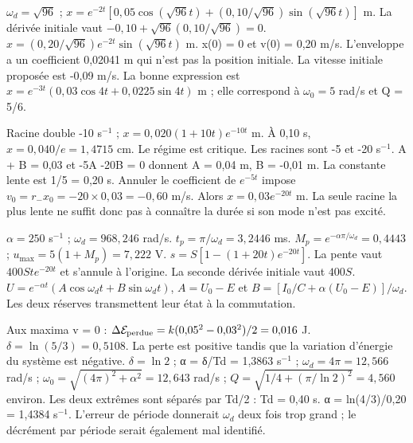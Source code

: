 $\omega_d=\sqrt{96}$ ; $x=e^{-2t}[0{,}05\cos(\sqrt{96}t)+(0{,}10/\sqrt{96})\sin(\sqrt{96}t)]$ m. La dérivée initiale vaut $-0{,}10+\sqrt{96}(0{,}10/\sqrt{96})=0$.
$x=(0{,}20/\sqrt{96})e^{-2t}\sin(\sqrt{96}t)$ m. x(0) = 0 et v(0) = 0,20 m/s. L’enveloppe a un coefficient 0,02041 m qui n’est pas la position initiale.
La vitesse initiale proposée est -0,09 m/s. La bonne expression est $x=e^{-3t}(0{,}03\cos4t+0{,}0225\sin4t)$ m ; elle correspond à $\omega_0=5$ rad/s et Q = 5/6.


Racine double -10 s$^{-1}$ ; $x=0{,}020(1+10t)e^{-10t}$ m. À 0,10 s, $x=0{,}040/e=1{,}4715$ cm. Le régime est critique.
Les racines sont -5 et -20 s$^{-1}$. A + B = 0,03 et -5A -20B = 0 donnent A = 0,04 m, B = -0,01 m. La constante lente est 1/5 = 0,20 s.
Annuler le coefficient de $e^{-5t}$ impose $v_0=r_-x_0=-20\times0{,}03=-0{,}60$ m/s. Alors $x=0{,}03e^{-20t}$ m. La seule racine la plus lente ne suffit donc pas à connaître la durée si son mode n’est pas excité.


$\alpha=250$ s$^{-1}$ ; $\omega_d=968{,}246$ rad/s. $t_p=\pi/\omega_d=3{,}2446$ ms. $M_p=e^{-\alpha\pi/\omega_d}=0{,}4443$ ; $u_{\max}=5(1+M_p)=7{,}222$ V.
$s=S[1-(1+20t)e^{-20t}]$. La pente vaut $400St e^{-20t}$ et s’annule à l’origine. La seconde dérivée initiale vaut $400S$.
$U=e^{-\alpha t}(A\cos\omega_dt+B\sin\omega_dt)$, $A=U_0-E$ et $B=[I_0/C+\alpha(U_0-E)]/\omega_d$. Les deux réserves transmettent leur état à la commutation.


Aux maxima v = 0 : $\Delta\mathcal E_{\rm perdue}=k(0{,}05^2-0{,}03^2)/2=0{,}016$ J. $\delta=\ln(5/3)=0{,}5108$. La perte est positive tandis que la variation d’énergie du système est négative.
$\delta=\ln2$ ; α = δ/Td = 1,3863 s$^{-1}$ ; $\omega_d=4\pi=12{,}566$ rad/s ; $\omega_0=\sqrt{(4\pi)^2+\alpha^2}=12{,}643$ rad/s ; $Q=\sqrt{1/4+(\pi/\ln2)^2}=4{,}560$ environ.
Les deux extrêmes sont séparés par Td/2 : Td = 0,40 s. α = ln(4/3)/0,20 = 1,4384 s$^{-1}$. L’erreur de période donnerait $\omega_d$ deux fois trop grand ; le décrément par période serait également mal identifié.


